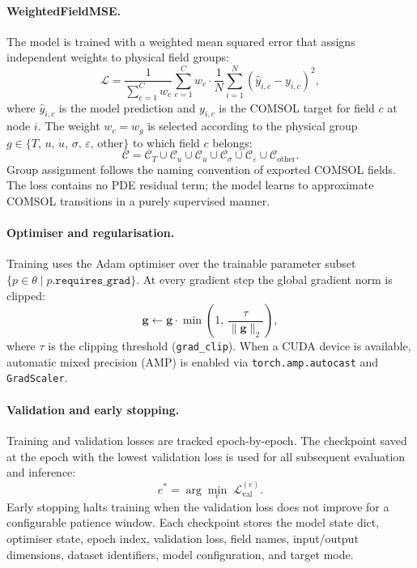 \paragraph{WeightedFieldMSE.}
The model is trained with a weighted mean squared error that assigns
independent weights to physical field groups:
\[
  \mathcal{L}
  = \frac{1}{\sum_{c=1}^{C} w_c}
    \sum_{c=1}^{C} w_c
    \cdot \frac{1}{N}
    \sum_{i=1}^{N}
    \left(\hat{y}_{i,c} - y_{i,c}\right)^2,
\]
where \(\hat{y}_{i,c}\) is the model prediction and \(y_{i,c}\) is the
COMSOL target for field \(c\) at node \(i\).
The weight \(w_c = w_g\) is selected according to the physical group
\(g\in\{T,\,u,\,\dot{u},\,\sigma,\,\varepsilon,\,\mathrm{other}\}\)
to which field \(c\) belongs:
\[
  \mathcal{C}
  = \mathcal{C}_{T}
    \cup \mathcal{C}_{u}
    \cup \mathcal{C}_{\dot{u}}
    \cup \mathcal{C}_{\sigma}
    \cup \mathcal{C}_{\varepsilon}
    \cup \mathcal{C}_{\mathrm{other}}.
\]
Group assignment follows the naming convention of exported COMSOL fields.
The loss contains no PDE residual term; the model learns to approximate
COMSOL transitions in a purely supervised manner.

\paragraph{Optimiser and regularisation.}
Training uses the Adam optimiser over the trainable parameter subset
\(\{p\in\theta \mid p\texttt{.requires\_grad}\}\).
At every gradient step the global gradient norm is clipped:
\[
  \mathbf{g}
  \leftarrow
  \mathbf{g}\cdot\min\!\left(1,\,\frac{\tau}{\|\mathbf{g}\|_2}\right),
\]
where \(\tau\) is the clipping threshold (\texttt{grad\_clip}).
When a CUDA device is available, automatic mixed precision (AMP) is enabled
via \texttt{torch.amp.autocast} and \texttt{GradScaler}.

\paragraph{Validation and early stopping.}
Training and validation losses are tracked epoch-by-epoch.
The checkpoint saved at the epoch with the lowest validation loss is used for
all subsequent evaluation and inference:
\[
  e^{*} = \arg\min_{e}\;\mathcal{L}_{\mathrm{val}}^{(e)}.
\]
Early stopping halts training when the validation loss does not improve for a
configurable patience window.
Each checkpoint stores the model state dict, optimiser state, epoch index,
validation loss, field names, input/output dimensions, dataset identifiers,
model configuration, and target mode.

